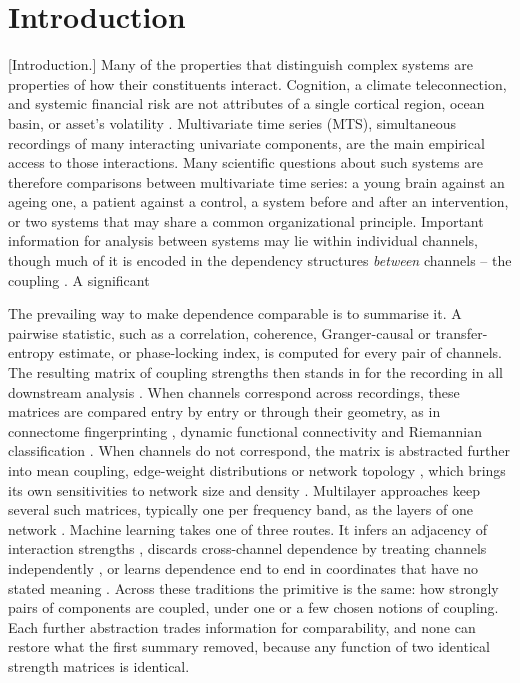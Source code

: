 \documentclass[pdflatex,sn-nature,iicol]{sn-jnl}
\newcommand{\will}[1]{\textcolor{mypurple}{[#1]}}
\newcommand{\will}[1]{}
\begin{document}
\section{Introduction}
\label{sec:intro}
\will{Introduction.}
Many of the properties that distinguish complex systems are properties of how their constituents interact. Cognition, a climate teleconnection, and systemic financial risk are not attributes of a single cortical region, ocean basin, or asset's volatility \cite{bassett2017network, tsonis2004architecture, mantegna1999hierarchical}. Multivariate time series (MTS), simultaneous recordings of many interacting univariate components, are the main empirical access to those interactions. Many scientific questions about such systems are therefore comparisons between multivariate time series: a young brain against an ageing one, a patient against a control, a system before and after an intervention, or two systems that may share a common organizational principle. Important information for analysis between systems may lie within individual channels, though much of it is encoded in the dependency structures \emph{between} channels -- the coupling \cite{friston2011functional, runge2019inferring}. A significant

The prevailing way to make dependence comparable is to summarise it. A pairwise statistic, such as a correlation, coherence, Granger-causal or transfer-entropy estimate, or phase-locking index, is computed for every pair of channels. The resulting matrix of coupling strengths then stands in for the recording in all downstream analysis \cite{pereda2005nonlinear,bastos2016tutorial}. When channels correspond across recordings, these matrices are compared entry by entry or through their geometry, as in connectome fingerprinting \cite{finn2015functional}, dynamic functional connectivity \cite{hutchison2013dynamic} and Riemannian classification \cite{barachant2012multiclass,dadi2019benchmarking}. When channels do not correspond, the matrix is abstracted further into mean coupling, edge-weight distributions or network topology \cite{bullmore2009complex,rubinov2010complex}, which brings its own sensitivities to network size and density \cite{vanwijk2010comparing,tantardini2019comparing}. Multilayer approaches keep several such matrices, typically one per frequency band, as the layers of one network \cite{brookes2016multilayer,buldu2018frequency}. Machine learning takes one of three routes. It infers an adjacency of interaction strengths \cite{wu2020connecting,jin2024gnn4ts}, discards cross-channel dependence by treating channels independently \cite{nie2023patchtst,han2024capacity}, or learns dependence end to end in coordinates that have no stated meaning \cite{liu2024itransformer,woo2024moirai}. Across these traditions the primitive is the same: how strongly pairs of components are coupled, under one or a few chosen notions of coupling. Each further abstraction trades information for comparability, and none can restore what the first summary removed, because any function of two identical strength matrices is identical.
\end{document}
